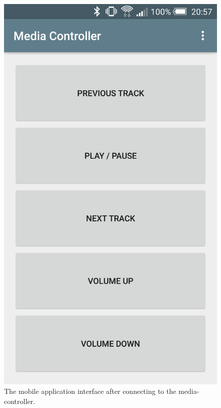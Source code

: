 \documentclass{article}
\begin{document}
\begin{figure}[]
\begin{minipage}[h]{0.29\textwidth}
					\includegraphics[width=\textwidth]{app}
					\caption{The mobile application interface after connecting to the media-controller.}
					\label{fig:app}
				\end{minipage}
				\hfill
				\begin{minipage}[h]{0.29\textwidth}
					\centering

\end{minipage}
\end{figure}
\end{document}
